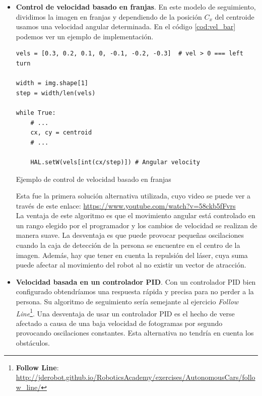 \begin{itemize}
	\item \textbf{Control de velocidad basado en franjas}. En este modelo de seguimiento, dividimos la imagen en franjas y dependiendo de la posición $C_{x}$ del centroide usamos una velocidad angular determinada. En el código \ref{cod:vel_bar} podemos ver un ejemplo de implementación.
\begin{code}[H]
\begin{lstlisting}
vels = [0.3, 0.2, 0.1, 0, -0.1, -0.2, -0.3]	 # vel > 0 === left turn

width = img.shape[1]
step = width/len(vels)

while True:
	# ...
	cx, cy = centroid
	# ...
	
	HAL.setW(vels[int(cx/step)]) # Angular velocity
\end{lstlisting}
\caption{Ejemplo de control de velocidad basado en franjas}
\label{cod:vel_bar}
\end{code}
	Esta fue la primera solución alternativa utilizada, cuyo video se puede ver a través de este enlace: \url{https://www.youtube.com/watch?v=58ckb5fFvrs}\\
	La ventaja de este algoritmo es que el movimiento angular está controlado en un rango elegido por el programador y los cambios de velocidad se realizan de manera suave. La desventaja es que puede provocar pequeñas oscilaciones cuando la caja de detección de la persona se encuentre en el centro de la imagen. Además, hay que tener en cuenta la repulsión del láser, cuya suma puede afectar al movimiento del robot al no existir un vector de atracción.
	
	\item \textbf{Velocidad basada en un controlador PID}. Con un controlador PID bien configurado obtendríamos una respuesta rápida y precisa para no perder a la persona. Su algoritmo de seguimiento sería semejante al ejercicio \textit{Follow Line}\footnote{\textbf{Follow Line}: \url{http://jderobot.github.io/RoboticsAcademy/exercises/AutonomousCars/follow_line/}}. Una desventaja de usar un controlador PID es el hecho de verse afectado a causa de una baja velocidad de fotogramas por segundo provocando oscilaciones constantes. Esta alternativa no tendría en cuenta los obstáculos.
	

\end{itemize}
